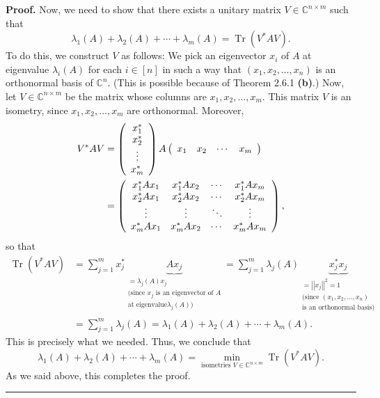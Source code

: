 \documentclass[numbers=enddot,12pt,final,onecolumn,notitlepage]{scrartcl}%
\numberwithin{exer}{subsection}
\theoremstyle{definition}
\newenvironment{proof}[1][Proof]{\noindent\textbf{#1.} }{\ \rule{0.5em}{0.5em}}
\let\sumnonlimits\sum
\renewcommand{\sum}{\sumnonlimits\limits}
\begin{document}
\begin{proof}
Now, we need to show that there exists a unitary matrix $V\in\mathbb{C}%
^{n\times m}$ such that%
\[
\lambda_{1}\left(  A\right)  +\lambda_{2}\left(  A\right)  +\cdots+\lambda
_{m}\left(  A\right)  =\operatorname*{Tr}\left(  V^{\ast}AV\right)  .
\]
To do this, we construct $V$ as follows: We pick an eigenvector $x_{i}$ of $A$
at eigenvalue $\lambda_{i}\left(  A\right)  $ for each $i\in\left[  n\right]
$ in such a way that $\left(  x_{1},x_{2},\ldots,x_{n}\right)  $ is an
orthonormal basis of $\mathbb{C}^{n}$. (This is possible because of Theorem
2.6.1 \textbf{(b)}.) Now, let $V\in\mathbb{C}^{n\times m}$ be the matrix whose
columns are $x_{1},x_{2},\ldots,x_{m}$. This matrix $V$ is an isometry, since
$x_{1},x_{2},\ldots,x_{m}$ are orthonormal. Moreover,%
\begin{align*}
V^{\ast}AV  &  =\left(
\begin{array}
[c]{c}%
x_{1}^{\ast}\\
x_{2}^{\ast}\\
\vdots\\
x_{m}^{\ast}%
\end{array}
\right)  A\left(
\begin{array}
[c]{cccc}%
x_{1} & x_{2} & \cdots & x_{m}%
\end{array}
\right) \\
&  =\left(
\begin{array}
[c]{cccc}%
x_{1}^{\ast}Ax_{1} & x_{1}^{\ast}Ax_{2} & \cdots & x_{1}^{\ast}Ax_{m}\\
x_{2}^{\ast}Ax_{1} & x_{2}^{\ast}Ax_{2} & \cdots & x_{2}^{\ast}Ax_{m}\\
\vdots & \vdots & \ddots & \vdots\\
x_{m}^{\ast}Ax_{1} & x_{m}^{\ast}Ax_{2} & \cdots & x_{m}^{\ast}Ax_{m}%
\end{array}
\right)  ,
\end{align*}
so that%
\begin{align*}
\operatorname*{Tr}\left(  V^{\ast}AV\right)   &  =\sum_{j=1}^{m}x_{j}^{\ast
}\underbrace{Ax_{j}}_{\substack{=\lambda_{j}\left(  A\right)  x_{j}%
\\\text{(since }x_{j}\text{ is an eigenvector of }A\\\text{at eigenvalue
}\lambda_{j}\left(  A\right)  \text{)}}}=\sum_{j=1}^{m}\lambda_{j}\left(
A\right)  \underbrace{x_{j}^{\ast}x_{j}}_{\substack{=\left\vert \left\vert
x_{j}\right\vert \right\vert ^{2}=1\\\text{(since }\left(  x_{1},x_{2}%
,\ldots,x_{n}\right)  \\\text{is an orthonormal basis)}}}\\
&  =\sum_{j=1}^{m}\lambda_{j}\left(  A\right)  =\lambda_{1}\left(  A\right)
+\lambda_{2}\left(  A\right)  +\cdots+\lambda_{m}\left(  A\right)  .
\end{align*}
This is precisely what we needed. Thus, we conclude that%
\[
\lambda_{1}\left(  A\right)  +\lambda_{2}\left(  A\right)  +\cdots+\lambda
_{m}\left(  A\right)  =\min\limits_{\text{isometries }V\in\mathbb{C}^{n\times
m}}\operatorname*{Tr}\left(  V^{\ast}AV\right)  .
\]
As we said above, this completes the proof.
\end{proof}
\end{document}
